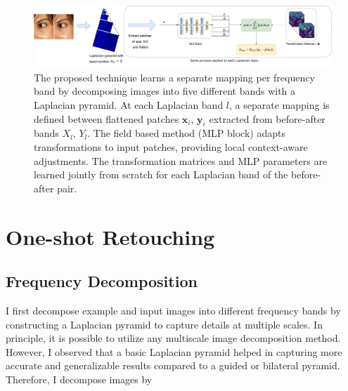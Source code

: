 \begin{landscape}
\begin{figure}[th] %
	\centering
	\includegraphics[width=1.5\textwidth]{Chapters/detail-retouching-figs/MainFig.pdf}
    \caption{The proposed technique learns a separate mapping per frequency band by decomposing images into five different bands with a Laplacian pyramid. At each Laplacian band $l$, a separate mapping is defined between flattened patches $\mathbf{x}_i$, $\mathbf{y}_i$ extracted from before-after bands $X_l$, $Y_l$. The field based method (MLP block) adapts transformations to input patches, providing local context-aware adjustments. The transformation matrices and MLP parameters are learned jointly from scratch for each Laplacian band of the before-after pair.}

\label{fig:modelT}
\end{figure}
 \end{landscape}

\section{One-shot Retouching}
\label{sec:Methodology}

\subsection{Frequency Decomposition}\label{sec:thePatchMap}

I first decompose example and input images into different frequency bands by constructing a Laplacian pyramid to capture details at multiple scales. In principle, it is possible to utilize any multiscale image decomposition method. However, I observed that a basic Laplacian pyramid helped in capturing more accurate and generalizable results compared to a guided or bilateral pyramid. Therefore, I decompose images by

